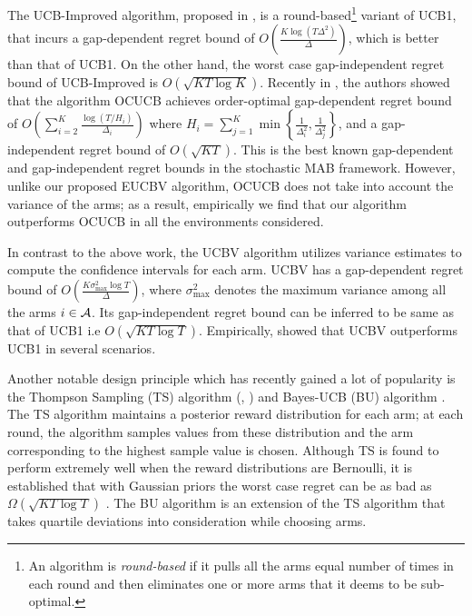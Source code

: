 	 The UCB-Improved algorithm, proposed in \citet{auer2010ucb}, is a round-based\footnote{An algorithm is \textit{round-based} if it pulls all the arms equal number of times in each round and then eliminates one or more arms that it deems  to be sub-optimal.} variant of UCB1, that 
incurs a gap-dependent regret bound of $O\left(\frac{K\log (T\Delta^{2})}{\Delta}\right)$, which is better than that of UCB1. On the other hand, the worst case gap-independent regret bound of UCB-Improved is $O\left(\sqrt{KT\log K}\right)$. Recently in \citet{lattimore2015optimally}, the authors showed that  the algorithm OCUCB achieves order-optimal gap-dependent regret bound of $O\left(\sum_{i=2}^{K}\frac{\log\left(T/H_i\right)}{\Delta_i}\right)$ where $H_i=\sum_{j=1}^{K}\min\left\lbrace \frac{1}{\Delta_i^2},\frac{1}{\Delta_j^2}\right\rbrace$, and a gap-independent regret bound of $O\left( \sqrt{KT}\right)$. This is the best known gap-dependent and gap-independent regret bounds in the stochastic MAB framework. However, unlike our proposed EUCBV algorithm, OCUCB does not take into account the variance of the arms; as a result, empirically  we find  that our algorithm outperforms OCUCB in all the environments considered. 

	In contrast to the above work, the UCBV \citep{audibert2009exploration} algorithm utilizes variance estimates to compute the confidence intervals for each arm. UCBV has a gap-dependent regret bound of $O\left(\frac{K\sigma_{\max}^{2}\log T}{\Delta}\right)$, where $\sigma_{\max}^{2}$ denotes the maximum variance among all the arms $i\in \mathcal{A}$. Its gap-independent regret bound can be inferred to be same as that of UCB1 i.e $O \left(\sqrt{KT\log T}\right)$. Empirically, \citet{audibert2009exploration} showed that UCBV outperforms UCB1 in several scenarios. 
	
	Another notable design principle which has recently gained a lot of popularity is the Thompson Sampling (TS) algorithm (\citep{thompson1933likelihood}, \citep{agrawal2011analysis})  and  Bayes-UCB (BU) algorithm \citep{kaufmann2012bayesian}. %
The TS algorithm maintains a posterior reward distribution for each arm; at each round, the algorithm samples values from these distribution and the arm corresponding to the highest sample value is chosen. Although TS is found to perform extremely well when the reward distributions are Bernoulli, it is established that with Gaussian priors the worst case regret can be as bad as $\Omega \left( \sqrt{KT\log T}\right)$ \cite{lattimore2015optimally}. The BU algorithm is an extension of the TS algorithm that takes quartile deviations into consideration while choosing arms.
	
